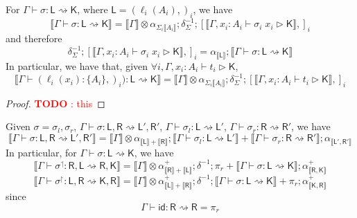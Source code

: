 \documentclass[acmsmall,screen,review]{acmart}
\newcounter{todos}
\newcommand{\todo}[1]{\stepcounter{todos} \textcolor{red}{\textbf{TODO \arabic{todos}}: #1}}
\newcommand{\ms}[1]{\ensuremath{\mathsf{#1}}}
\newcommand{\lto}{:}
\newcommand{\wbranch}[3]{#1(#2) \lto \{#3\}}
\newcommand{\rupg}[1]{{#1}^\upharpoonright}
\newcommand{\lupg}[1]{{#1}^\upharpoonleft}
\newcommand{\bhyp}[2]{#1 : #2}
\newcommand{\haslb}[3]{#1 \vdash #2 \rhd #3}
\newcommand{\lbsubst}[4]{#1 \vdash #2: #3 \rightsquigarrow #4}
\newcommand{\dnt}[1]{\llbracket{#1}\rrbracket}
\begin{document}
\begin{lemma}
  For $\lbsubst{\Gamma}{\sigma}{\ms{L}}{\ms{K}}$, where $\ms{L} = (\ell_i(A_i),)_i$, we have
  \begin{equation}
    \dnt{\lbsubst{\Gamma}{\sigma}{\ms{L}}{\ms{K}}} 
    = \dnt{\Gamma} \otimes \alpha_{\Sigma_i\dnt{A_i}} 
    ; \delta^{-1}_{\Sigma}
    ; [\dnt{\haslb{\Gamma, \bhyp{x_i}{A_i}}{\sigma_i\;x_i}{\ms{K}}},]_i
  \end{equation}
  and therefore
  \begin{equation}
    \delta^{-1}_{\Sigma}
    ; [\dnt{\haslb{\Gamma, \bhyp{x_i}{A_i}}{\sigma_i\;x_i}{\ms{K}}},]_i
    = \alpha_{\dnt{\ms{L}}}
    ; \dnt{\lbsubst{\Gamma}{\sigma}{\ms{L}}{\ms{K}}} 
  \end{equation}
  In particular, we have that, given $\forall i, \haslb{\Gamma, \bhyp{x_i}{A_i}}{t_i}{\ms{K}}$,
  \begin{equation}
    \dnt{\lbsubst{\Gamma}{(\wbranch{\ell_i}{x_i}{A_i},)_i)}{\ms{L}}{\ms{K}}}
    = \dnt{\Gamma} \otimes \alpha_{\Sigma_i\dnt{A_i}} 
    ; \delta^{-1}_{\Sigma}
    ; [\dnt{\haslb{\Gamma, \bhyp{x_i}{A_i}}{t_i}{\ms{K}}},]_i
  \end{equation}
  \label{lem:lsubst-distrib}
\end{lemma}

\begin{proof}
  \todo{this}
\end{proof}

\begin{lemma}
  Given $\sigma = \sigma_l, \sigma_r$,
    $\lbsubst{\Gamma}{\sigma}{\ms{L}, \ms{R}}{\ms{L}', \ms{R}'}$,
    $\lbsubst{\Gamma}{\sigma_l}{\ms{L}}{\ms{L}'}$,
    $\lbsubst{\Gamma}{\sigma_r}{\ms{R}}{\ms{R}'}$, we have
  \begin{equation}
    \dnt{\lbsubst{\Gamma}{\sigma}{\ms{L}, \ms{R}}{\ms{L}', \ms{R}'}}
    = \dnt{\Gamma} \otimes \alpha_{\dnt{\ms{L}} + \dnt{\ms{R}}} 
    ; \dnt{\lbsubst{\Gamma}{\sigma_l}{\ms{L}}{\ms{L}'}} 
    + \dnt{\lbsubst{\Gamma}{\sigma_r}{\ms{R}}{\ms{R}'}}
    ; \alpha_{\dnt{\ms{L}', \ms{R}'}}
  \end{equation}
  In particular, for $\lbsubst{\Gamma}{\sigma}{\ms{L}}{\ms{K}}$, we have
  \begin{equation}
    \dnt{\lbsubst{\Gamma}{\lupg{\sigma}}{\ms{R}, \ms{L}}{\ms{R}, \ms{K}}}
    = \dnt{\Gamma} \otimes \alpha^+_{\dnt{\ms{R}} + \dnt{\ms{L}}} 
      ; \delta^{-1} 
      ; \pi_r + \dnt{\lbsubst{\Gamma}{\sigma}{\ms{L}}{\ms{K}}}
      ; \alpha^+_{\dnt{\ms{R}, \ms{K}}}
  \end{equation}
  \begin{equation}
    \dnt{\lbsubst{\Gamma}{\rupg{\sigma}}{\ms{L}, \ms{R}}{\ms{K}, \ms{R}}}
    = \dnt{\Gamma} \otimes \alpha^+_{\dnt{\ms{L}} + \dnt{\ms{R}}} 
      ; \delta^{-1} 
      ; \dnt{\lbsubst{\Gamma}{\sigma}{\ms{L}}{\ms{K}}} + \pi_r
      ; \alpha^+_{\dnt{\ms{K}, \ms{R}}}
  \end{equation}
  since
  \begin{equation}
    \lbsubst{\Gamma}{\ms{id}}{\ms{R}}{\ms{R}} = \pi_r
  \end{equation}
\end{lemma}
\end{document}
